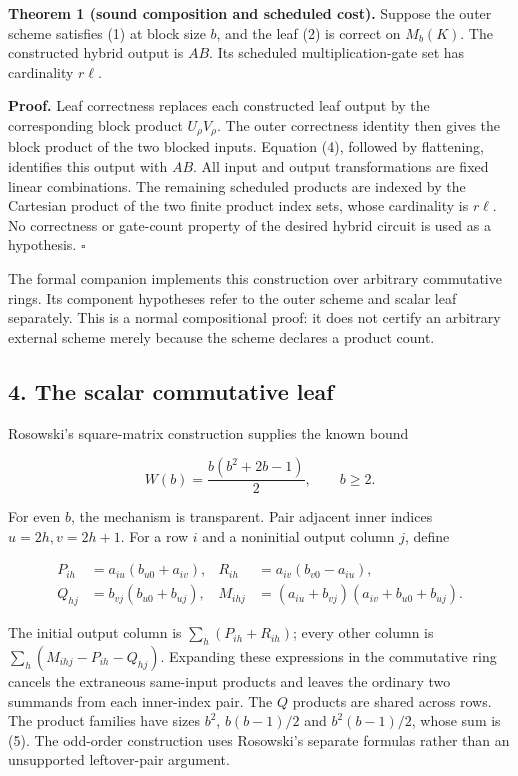 \documentclass[
  11pt,
]{article}
\begin{document}
\textbf{Theorem 1 (sound composition and scheduled cost).} Suppose the
outer scheme satisfies (1) at block size \(b\), and the leaf (2) is
correct on \(M_b(K)\). The constructed hybrid output is \(AB\). Its
scheduled multiplication-gate set has cardinality \(r\ell\).

\textbf{Proof.} Leaf correctness replaces each constructed leaf output
by the corresponding block product \(U_\rho V_\rho\). The outer
correctness identity then gives the block product of the two blocked
inputs. Equation (4), followed by flattening, identifies this output
with \(AB\). All input and output transformations are fixed linear
combinations. The remaining scheduled products are indexed by the
Cartesian product of the two finite product index sets, whose
cardinality is \(r\ell\). No correctness or gate-count property of the
desired hybrid circuit is used as a hypothesis. \(\square\)

The formal companion implements this construction over arbitrary
commutative rings. Its component hypotheses refer to the outer scheme
and scalar leaf separately. This is a normal compositional proof: it
does not certify an arbitrary external scheme merely because the scheme
declares a product count.

\subsection{4. The scalar commutative
leaf}\label{the-scalar-commutative-leaf}

Rosowski's square-matrix construction supplies the known bound

\[
W(b)=\frac{b(b^2+2b-1)}2,\qquad b\ge2.
\tag{5}
\]

For even \(b\), the mechanism is transparent. Pair adjacent inner
indices \(u=2h,v=2h+1\). For a row \(i\) and a noninitial output column
\(j\), define

\[
\begin{aligned}
P_{ih}&=a_{iu}(b_{u0}+a_{iv}),&
R_{ih}&=a_{iv}(b_{v0}-a_{iu}),\\
Q_{hj}&=b_{vj}(b_{u0}+b_{uj}),&
M_{ihj}&=(a_{iu}+b_{vj})(a_{iv}+b_{u0}+b_{uj}).
\end{aligned}
\tag{6}
\]

The initial output column is \(\sum_h(P_{ih}+R_{ih})\); every other
column is \(\sum_h(M_{ihj}-P_{ih}-Q_{hj})\). Expanding these expressions
in the commutative ring cancels the extraneous same-input products and
leaves the ordinary two summands from each inner-index pair. The \(Q\)
products are shared across rows. The product families have sizes
\(b^2\), \(b(b-1)/2\) and \(b^2(b-1)/2\), whose sum is (5). The
odd-order construction uses Rosowski's separate formulas rather than an
unsupported leftover-pair argument.
\end{document}
